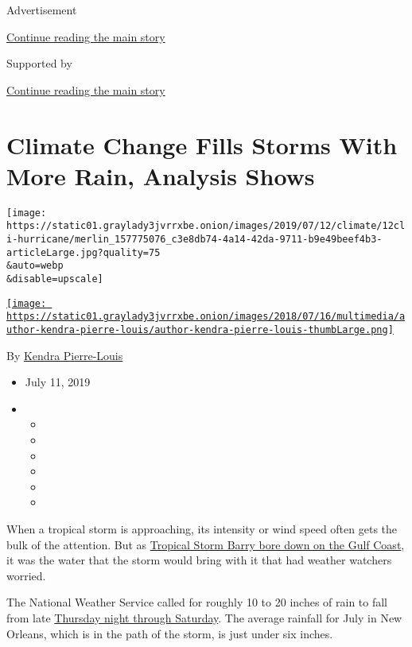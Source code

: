 Advertisement

\protect\hyperlink{after-top}{Continue reading the main story}

Supported by

\protect\hyperlink{after-sponsor}{Continue reading the main story}

\hypertarget{climate-change-fills-storms-with-more-rain-analysis-shows}{%
\section{Climate Change Fills Storms With More Rain, Analysis
Shows}\label{climate-change-fills-storms-with-more-rain-analysis-shows}}

\texttt{[image: https://static01.graylady3jvrrxbe.onion/images/2019/07/12/climate/12cli-hurricane/merlin\_157775076\_c3e8db74-4a14-42da-9711-b9e49beef4b3-articleLarge.jpg?quality=75\\\&auto=webp\\\&disable=upscale]}

\href{https://www.nytimes3xbfgragh.onion/by/kendra-pierre-louis}{\texttt{[image: https://static01.graylady3jvrrxbe.onion/images/2018/07/16/multimedia/author-kendra-pierre-louis/author-kendra-pierre-louis-thumbLarge.png]}}

By
\href{https://www.nytimes3xbfgragh.onion/by/kendra-pierre-louis}{Kendra
Pierre-Louis}

\begin{itemize}
\item
  July 11, 2019
\item
  \begin{itemize}
  \item
  \item
  \item
  \item
  \item
  \item
  \end{itemize}
\end{itemize}

When a tropical storm is approaching, its intensity or wind speed often
gets the bulk of the attention. But as
\href{https://www.nytimes3xbfgragh.onion/2019/07/11/us/hurricane-barry-tropical-storm-questions.html}{Tropical
Storm Barry bore down on the Gulf Coast}, it was the water that the
storm would bring with it that had weather watchers worried.

The National Weather Service called for roughly 10 to 20 inches of rain
to fall from late
\href{https://www.nytimes3xbfgragh.onion/2019/07/11/us/hurricane-barry-tropical-storm-questions.html}{Thursday
night through Saturday}. The average rainfall for July in New Orleans,
which is in the path of the storm, is just under six inches.

